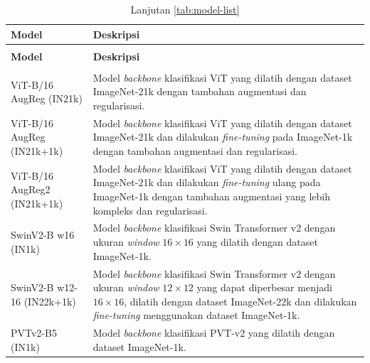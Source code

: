 {
	\footnotesize
	\renewcommand{\arraystretch}{1.3} %
	\noindent
	
	\begin{xltabular}{\textwidth}{|
			>{\hsize}X |
			>{\hsize}X | }
		
		\caption{Daftar Model Transformer \textit{Pretrained} yang Diujikan} 
		\label{tab:model-list} \\
		
		\hline
		\centering\textbf{Model} & \centering\textbf{Deskripsi} \arraybackslash \\ \hline
		\endfirsthead
		
		\caption*{Lanjutan \autoref{tab:model-list}} \\
		\hline
		\centering\textbf{Model} & \textbf{Deskripsi} \arraybackslash \\ \hline
		\endhead
		
		\hline
		 \\
		\endfoot
		
		\hline
		\endlastfoot
		
		ViT-B/16 AugReg (IN21k) &  Model \textit{backbone} klasifikasi ViT yang dilatih dengan dataset ImageNet-21k dengan tambahan augmentasi dan regularisasi. \\ \hline
		ViT-B/16 AugReg (IN21k+1k) & Model \textit{backbone} klasifikasi ViT yang dilatih dengan dataset ImageNet-21k dan dilakukan \textit{fine-tuning} pada ImageNet-1k dengan tambahan augmentasi dan regularisasi. \\ \hline
		ViT-B/16 AugReg2 (IN21k+1k) & Model \textit{backbone} klasifikasi ViT yang dilatih dengan dataset ImageNet-21k dan dilakukan \textit{fine-tuning} ulang pada ImageNet-1k dengan tambahan augmentasi yang lebih kompleks dan regularisasi. \\ \hline
		SwinV2-B w16 (IN1k) & Model \textit{backbone} klasifikasi Swin Transformer v2 dengan ukuran \textit{window} $16 \times 16$ yang dilatih dengan dataset ImageNet-1k.  \\ \hline
		SwinV2-B w12-16 (IN22k+1k) & Model \textit{backbone} klasifikasi Swin Transformer v2 dengan ukuran \textit{window} $12 \times 12$ yang dapat diperbesar menjadi $16 \times 16$, dilatih dengan dataset ImageNet-22k dan dilakukan \textit{fine-tuning} menggunakan dataset ImageNet-1k. \\ \hline
		PVTv2-B5 (IN1k) & Model \textit{backbone} klasifikasi PVT-v2 yang dilatih dengan dataset ImageNet-1k. \\ \hline
		
	\end{xltabular}
}

